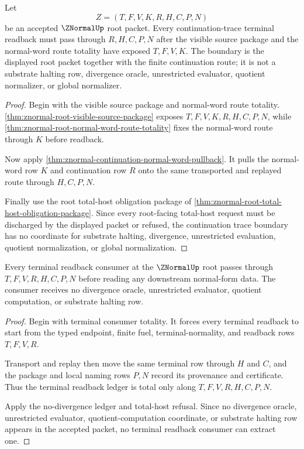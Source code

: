\begin{theorem}
\label{thm:znormal-root-continuation-trace-boundary}
Let
$$
Z=(T,F,V,K,R,H,C,P,N)
$$
be an accepted $\ZNormalUp$ root packet. Every continuation-trace terminal readback must pass through $R,H,C,P,N$ after the visible source package and the normal-word route totality have exposed $T,F,V,K$. The boundary is the displayed root packet together with the finite continuation route; it is not a substrate halting row, divergence oracle, unrestricted evaluator, quotient normalizer, or global normalizer.
\end{theorem}
\begin{proof}
Begin with the visible source package and normal-word route totality. \autoref{thm:znormal-root-visible-source-package} exposes $T,F,V,K,R,H,C,P,N$, while \autoref{thm:znormal-root-normal-word-route-totality} fixes the normal-word route through $K$ before readback.

Now apply \autoref{thm:znormal-continuation-normal-word-pullback}. It pulls the normal-word row $K$ and continuation row $R$ onto the same transported and replayed route through $H,C,P,N$.

Finally use the root total-host obligation package of \autoref{thm:znormal-root-total-host-obligation-package}. Since every root-facing total-host request must be discharged by the displayed packet or refused, the continuation trace boundary has no coordinate for substrate halting, divergence, unrestricted evaluation, quotient normalization, or global normalization.
\end{proof}

\begin{theorem}
\label{thm:znormal-root-terminal-readback-ledger-totality}
Every terminal readback consumer at the $\ZNormalUp$ root passes through
$T,F,V,R,H,C,P,N$ before reading any downstream normal-form data. The consumer
receives no divergence oracle, unrestricted evaluator, quotient computation,
or substrate halting row.
\end{theorem}
\begin{proof}
Begin with terminal consumer totality. It forces every terminal readback to
start from the typed endpoint, finite fuel, terminal-normality, and readback
rows $T,F,V,R$.

Transport and replay then move the same terminal row through $H$ and $C$, and
the package and local naming rows $P,N$ record its provenance and certificate.
Thus the terminal readback ledger is total only along $T,F,V,R,H,C,P,N$.

Apply the no-divergence ledger and total-host refusal. Since no divergence
oracle, unrestricted evaluator, quotient-computation coordinate, or substrate
halting row appears in the accepted packet, no terminal readback consumer can
extract one.
\end{proof}
